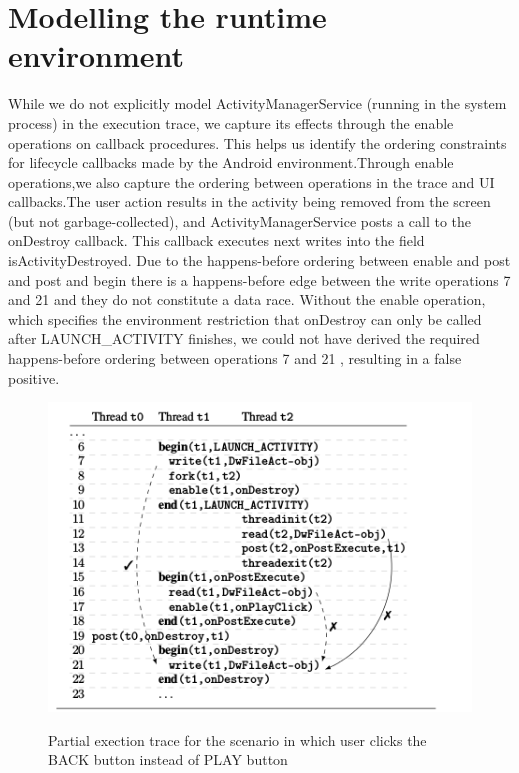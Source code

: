 \documentclass[11pt]{report}
\begin{document}
\section{Modelling the runtime environment}
\par While we do not explicitly model ActivityManagerService (running in the system process) in  the  execution  trace,  we  capture  its  effects  through  the enable
operations on callback procedures. This helps us identify the ordering constraints for lifecycle callbacks made by the Android environment.Through enable operations,we also 
capture the ordering between operations in the trace and UI callbacks.The user action results in the activity being removed from the screen (but not garbage-collected), and 
ActivityManagerService posts a call to the onDestroy callback. This callback executes next writes into the field isActivityDestroyed. Due to the happens-before ordering between
enable and post and post and begin there is a happens-before edge between the write operations 7 and 21 and they do not constitute a data race. Without the enable operation, 
which specifies the environment restriction that onDestroy can only be called after LAUNCH\_ACTIVITY finishes, we could not have derived the required happens-before ordering between 
operations 7 and 21 , resulting in a false positive.\\
\begin{figure}
 \centering
 \includegraphics[width=150mm]{./images/partial_execution_trace.png}\\
\caption{Partial exection trace for the scenario in which user clicks the BACK button instead of PLAY button}
\end{figure}
\end{document}
